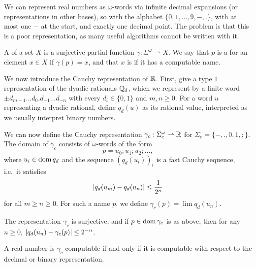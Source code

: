 

We can represent real numbers as $\omega$-words via infinite decimal expansions
(or representations in other bases), so with the alphabet $\{0,1, \ldots, 9, -,
.\}$, with at most one $-$ at the start, and exactly one decimal point.
The problem is that this is a poor representation, as many useful algorithms
cannot be written with it.

\begin{definition}
  A  of a set $X$ is a surjective partial function
  $\gamma: \Sigma^\omega \rightharpoonup X$.
  We say that $p$ is a  for an element $x \in X$ if $\gamma(p) = x$,
  and that $x$ is  if it has a computable name.
\end{definition}

We now introduce the Cauchy representation of $\mathbb{R}$.
First, give a type $1$ representation of the dyadic rationals $\mathbb{Q}_d$, which we
represent by a finite word $\pm d_{m-1} \ldots d_0 . d_{-1} \ldots d_{-n}$
with every $d_i \in \{0, 1\}$ and $m, n \ge 0$.
For a word $u$ representing a dyadic rational, define $q_d(u)$ as its rational
value, interpreted as we usually interpret binary numbers.

We can now define the Cauchy representation $\gamma_c: \Sigma_c^\omega
\rightharpoonup \mathbb{R}$ for $\Sigma_c = \{ -, ., 0, 1, ; \}$.
The domain of $\gamma_c$ consists of $\omega$-words of the form
\[
  p = u_0; u_1; u_2; \ldots,
\]
where $u_i \in \operatorname{dom} q_d$ and the sequence $(q_d(u_i))_i$ is a fast Cauchy
sequence, i.e.~it satisfies
\[
  \left| q_d(u_m) - q_d(u_n) \right| \le \frac{1}{2^n}
\]
for all $m \ge n \ge 0$.
For such a name $p$, we define $\gamma_c(p) = \lim q_d(u_n)$.

\begin{proposition}
  The representation $\gamma_c$ is surjective, and if $p \in \operatorname{dom} \gamma_c$ is
  as above, then for any $n \ge 0$, $\left| q_d(u_n) - \gamma_c(p) \right| \le 2^{-n}$.
\end{proposition}

\begin{proposition}
  A real number is $\gamma_c$-computable if and only if it is computable with
  respect to the decimal or binary representation.
\end{proposition}


